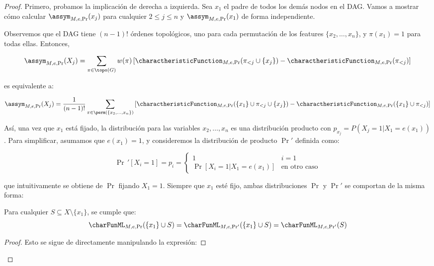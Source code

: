 \begin{proof}
Primero, probamos la implicación de derecha a izquierda. Sea \(x_1\) el padre de todos los demás nodos en el DAG. Vamos a mostrar cómo calcular \(\assym_{M,e,\Pr}(x_j)\) para cualquier \(2 \leq j \leq n\) y \(\assym_{M,e,\Pr}(x_1)\) de forma independiente.

Observemos que el DAG tiene \((n-1)!\) órdenes topológicos, uno para cada permutación de los features \(\{x_2, \ldots, x_n\}\), y \(\pi(x_1) = 1\) para todas ellas. Entonces,

\[\label{eq:assymetric_for_naive_child}
\assym_{M,e,\Pr}(X_j) = \sum_{\pi \in \topo(G)} w(\pi) \left[ \charactheristicFunction_{M,e,\Pr}(\pi_{<j} \cup \{x_j\}) 
- \charactheristicFunction_{M,e,\Pr}(\pi_{<j}) \right]
\]

es equivalente a:

\[
\assym_{M,e,\Pr}(X_j) = \frac{1}{(n-1)!} \sum_{\pi \in \perm(\{x_2, \ldots, x_n\})} \left[ \charactheristicFunction_{M,e,\Pr}(\{x_1\} \cup \pi_{<j} \cup \{x_j\}) - \charactheristicFunction_{M,e,\Pr}(\{x_1\} \cup \pi_{<j}) \right]
\]

Así, una vez que \(x_1\) está fijado, la distribución para las variables \(x_2, \ldots, x_n\) es una distribución producto con \(p_{x_j} = P(X_j = 1 | X_1 = e(x_1))\). Para simplificar, asumamos que \(e(x_1) = 1\), y consideremos la distribución de producto \(\Pr'\) definida como:

\[
\Pr\,'[X_i = 1] = p_i = 
\begin{cases}
1 & i = 1 \\
\Pr[X_i = 1 | X_1 = e(x_1)] & \text{en otro caso}
\end{cases}
\]

que intuitivamente se obtiene de \(\Pr\) fijando \(X_1 = 1\). Siempre que \(x_1\) esté fijo, ambas distribuciones \(\Pr\) y \(\Pr'\) se comportan de la misma forma:


\begin{lemma}\label{lemma:valuation_of_prob_function}
Para cualquier \(S \subseteq X \setminus \{x_1\}\), se cumple que:
\[
\charFunML_{M,e,\Pr}(\{x_1\} \cup S) = \charFunML_{M,e,\Pr'}(\{x_1\} \cup S) = \charFunML_{M,e,\Pr'}(S)
\]
\end{lemma}

\begin{proof}
Esto se sigue de directamente manipulando la expresión:
    

\end{proof}
\end{proof}
